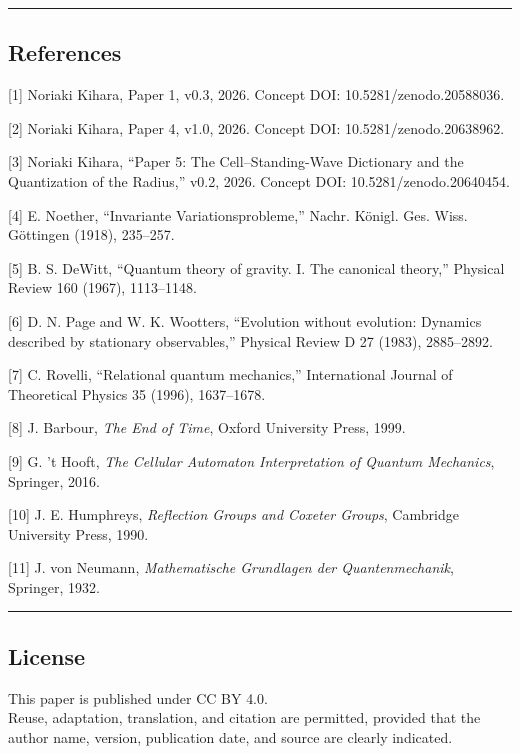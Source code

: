 \documentclass[
]{ltjsarticle}
\begin{document}
\begin{center}\rule{0.5\linewidth}{0.5pt}\end{center}

\subsection{References}\label{references}

{[}1{]} Noriaki Kihara, Paper 1, v0.3, 2026. Concept DOI:
10.5281/zenodo.20588036.

{[}2{]} Noriaki Kihara, Paper 4, v1.0, 2026. Concept DOI:
10.5281/zenodo.20638962.

{[}3{]} Noriaki Kihara, ``Paper 5: The Cell--Standing-Wave Dictionary
and the Quantization of the Radius,'' v0.2, 2026. Concept DOI:
10.5281/zenodo.20640454.

{[}4{]} E. Noether, ``Invariante Variationsprobleme,'' Nachr. Königl.
Ges. Wiss. Göttingen (1918), 235--257.

{[}5{]} B. S. DeWitt, ``Quantum theory of gravity. I. The canonical
theory,'' Physical Review 160 (1967), 1113--1148.

{[}6{]} D. N. Page and W. K. Wootters, ``Evolution without evolution:
Dynamics described by stationary observables,'' Physical Review D 27
(1983), 2885--2892.

{[}7{]} C. Rovelli, ``Relational quantum mechanics,'' International
Journal of Theoretical Physics 35 (1996), 1637--1678.

{[}8{]} J. Barbour, \emph{The End of Time}, Oxford University Press,
1999.

{[}9{]} G. 't Hooft, \emph{The Cellular Automaton Interpretation of
Quantum Mechanics}, Springer, 2016.

{[}10{]} J. E. Humphreys, \emph{Reflection Groups and Coxeter Groups},
Cambridge University Press, 1990.

{[}11{]} J. von Neumann, \emph{Mathematische Grundlagen der
Quantenmechanik}, Springer, 1932.

\begin{center}\rule{0.5\linewidth}{0.5pt}\end{center}

\subsection{License}\label{license}

This paper is published under CC BY 4.0.\\
Reuse, adaptation, translation, and citation are permitted, provided
that the author name, version, publication date, and source are clearly
indicated.
\end{document}
